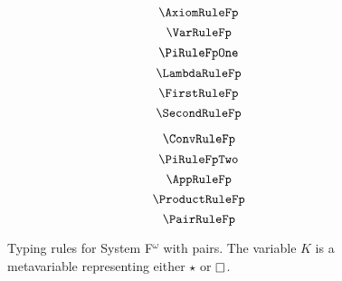 
\begin{figure}
    \centering
    \begin{minipage}{0.5\textwidth}
        $$\AxiomRuleFp$$
        $$\VarRuleFp$$
        $$\PiRuleFpOne$$
        $$\LambdaRuleFp$$
        $$\FirstRuleFp$$
        $$\SecondRuleFp$$
    \end{minipage}%
    \begin{minipage}{0.5\textwidth}
        $$\ConvRuleFp$$
        $$\PiRuleFpTwo$$
        $$\AppRuleFp$$
        $$\ProductRuleFp$$
        $$\PairRuleFp$$
    \end{minipage}%
    \caption{
        Typing rules for System F$^\omega$ with pairs. The variable $K$ is a metavariable representing either $\star$ or $\kind$.
    }
    \label{fig:typing_fp}
\end{figure}
